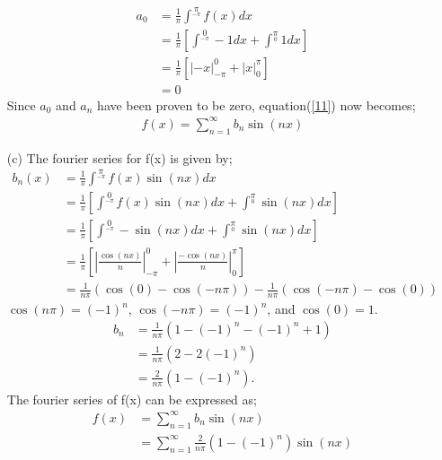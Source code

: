 \documentclass[12pt,a4paper]{article}
\begin{document}
\begin{itemize}
\begin{align*}
	a_{0}&=\frac{1}{\pi}\int^{\pi}\limits_{-\pi}f(x)dx\\
	&=\frac{1}{\pi}[\int^{0}\limits_{-\pi}-1dx + \int^{\pi}\limits_{0}1dx ]\\
	&=\frac{1}{\pi}[|-x|^{0}_{-\pi}+|x|^{\pi}_{0}]\\
	&=0
	\end{align*}
	Since $a_{0}$ and $a_{n}$ have been proven to be zero, equation(\ref{11}) now becomes;\\
	\begin{align*}
	f(x)=\sum^{\infty}_{n=1} b_{n}\sin(nx)
	\end{align*}
	\item[(c)]
	The fourier series for f(x) is given by;\\
	\begin{align*}
	b_{n}(x)&=\frac{1}{\pi}\int^{\pi}\limits_{-\pi}f(x)\sin(nx)dx\\
	&=\frac{1}{\pi}[\int^{0}\limits_{-\pi}f(x)\sin(nx)dx + \int^{\pi}\limits_{0}\sin(nx)dx ]\\
	&=\frac{1}{\pi}[\int^{0}\limits_{-\pi}-\sin(nx)dx+\int^{\pi}\limits_{0}\sin(nx)dx ]\\
	&=\frac{1}{\pi}[|\frac{\cos (nx)}{n}|^{0}_{-\pi}+|\frac{-\cos (nx)}{n}|^{\pi}_{0} ]\\
	&=\frac{1}{n\pi}(\cos(0)-\cos(-n\pi))-\frac{1}{n\pi}(\cos(-n\pi)-\cos(0))
	\end{align*}
$\cos(n\pi)=(-1)^{n}$,  $\cos(-n\pi)=(-1)^{n}$, and $\cos(0)=1$.
\begin{align*}
b_{n}&=\frac{1}{n\pi}(1-(-1)^{n}-(-1)^{n}+1)\\
&=\frac{1}{n\pi}(2-2(-1)^{n})\\
&=\frac{2}{n\pi}(1-(-1)^{n}).
\end{align*}
The fourier series of f(x) can be expressed as;
\begin{align*}
f(x)&=\sum^{\infty}_{n=1} b_{n}\sin(nx)\\
&=\sum^{\infty}_{n=1} \frac{2}{n\pi}(1-(-1)^{n}) \sin(nx)
\end{align*}
\end{itemize}
\end{document}
